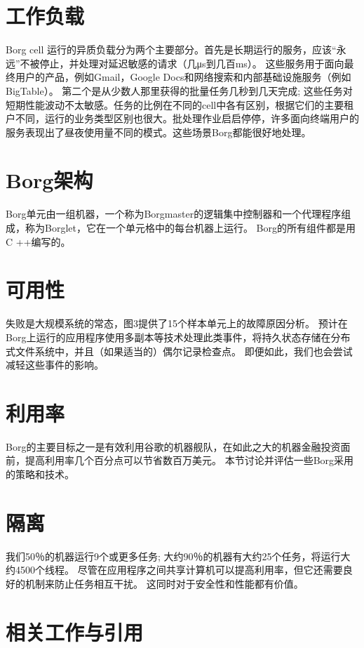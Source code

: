 \section{工作负载}

Borg cell 运行的异质负载分为两个主要部分。首先是长期运行的服务，应该“永远”不被停止，并处理对延迟敏感的请求（几μs到几百ms）。 这些服务用于面向最终用户的产品，例如Gmail，Google Docs和网络搜索和内部基础设施服务（例如BigTable）。 第二个是从少数人那里获得的批量任务几秒到几天完成; 这些任务对短期性能波动不太敏感。任务的比例在不同的cell中各有区别，根据它们的主要租户不同，运行的业务类型区别也很大。批处理作业启启停停，许多面向终端用户的服务表现出了昼夜使用量不同的模式。这些场景Borg都能很好地处理。

\section{Borg架构}

Borg单元由一组机器，一个称为Borgmaster的逻辑集中控制器和一个代理程序组成，称为Borglet，它在一个单元格中的每台机器上运行。 Borg的所有组件都是用C ++编写的。

\section{可用性}

失败是大规模系统的常态，图3提供了15个样本单元上的故障原因分析。 预计在Borg上运行的应用程序使用多副本等技术处理此类事件，将持久状态存储在分布式文件系统中，并且（如果适当的）偶尔记录检查点。 即便如此，我们也会尝试减轻这些事件的影响。

\section{利用率}

Borg的主要目标之一是有效利用谷歌的机器舰队，在如此之大的机器金融投资面前，提高利用率几个百分点可以节省数百万美元。 本节讨论并评估一些Borg采用的策略和技术。

\section{隔离}

我们50％的机器运行9个或更多任务; 大约90％的机器有大约25个任务，将运行大约4500个线程。 尽管在应用程序之间共享计算机可以提高利用率，但它还需要良好的机制来防止任务相互干扰。 这同时对于安全性和性能都有价值。

\section{相关工作与引用}

